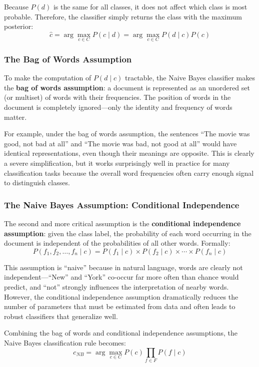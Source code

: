 \documentclass[11pt,a4paper]{article}
\begin{document}
Because $P(d)$ is the same for all classes, it does not affect which class is most probable. Therefore, the classifier simply returns the class with the maximum posterior:
\[
\hat{c} = \arg\max_{c \in C} P(c \mid d) = \arg\max_{c \in C} P(d \mid c) P(c)
\]

\subsubsection{The Bag of Words Assumption}

To make the computation of $P(d \mid c)$ tractable, the Naive Bayes classifier makes the \textbf{bag of words assumption}: a document is represented as an unordered set (or multiset) of words with their frequencies. The position of words in the document is completely ignored---only the identity and frequency of words matter.

For example, under the bag of words assumption, the sentences ``The movie was good, not bad at all'' and ``The movie was bad, not good at all'' would have identical representations, even though their meanings are opposite. This is clearly a severe simplification, but it works surprisingly well in practice for many classification tasks because the overall word frequencies often carry enough signal to distinguish classes.

\subsubsection{The Naive Bayes Assumption: Conditional Independence}

The second and more critical assumption is the \textbf{conditional independence assumption}: given the class label, the probability of each word occurring in the document is independent of the probabilities of all other words. Formally:
\[
P(f_1, f_2, \ldots, f_n \mid c) = P(f_1 \mid c) \times P(f_2 \mid c) \times \cdots \times P(f_n \mid c)
\]

This assumption is ``naive'' because in natural language, words are clearly not independent---``New'' and ``York'' co-occur far more often than chance would predict, and ``not'' strongly influences the interpretation of nearby words. However, the conditional independence assumption dramatically reduces the number of parameters that must be estimated from data and often leads to robust classifiers that generalize well.

Combining the bag of words and conditional independence assumptions, the Naive Bayes classification rule becomes:
\[
c_{NB} = \arg\max_{c \in C} P(c) \prod_{f \in F} P(f \mid c)
\]
\end{document}
